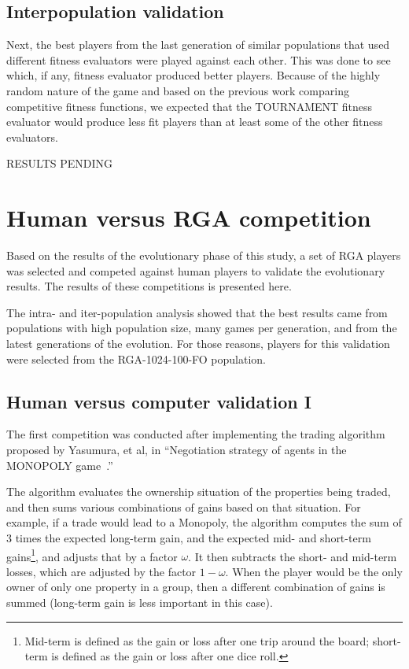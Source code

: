 \subsection{Interpopulation validation}

Next, the best players from the last generation of similar populations that used
different fitness evaluators were played against each other. This was done to
see which, if any, fitness evaluator produced better players. Because of the
highly random nature of the game and based on the previous work comparing
competitive fitness functions, we expected that the TOURNAMENT fitness evaluator
would produce less fit players than at least some of the other fitness
evaluators.

RESULTS PENDING

\section{Human versus RGA competition}

Based on the results of the evolutionary phase of this study, a set of RGA
players was selected and competed against human players to validate the
evolutionary results. The results of these competitions is presented here.

The intra- and iter-population analysis showed that the best results came from
populations with high population size, many games per generation, and from the
latest generations of the evolution. For those reasons, players for this
validation were selected from the RGA-1024-100-FO population.

\subsection{Human versus computer validation I}

The first competition was conducted after implementing the trading algorithm
proposed by Yasumura, et al, in ``Negotiation strategy of agents in the MONOPOLY
game~\cite{Yasumura2001Negotiate}.''

The algorithm evaluates the ownership situation of the properties being traded,
and then sums various combinations of gains based on that situation. For
example, if a trade would lead to a Monopoly, the algorithm computes the sum of
3 times the expected long-term gain, and the expected mid- and short-term
gains\footnote{Mid-term is defined as the gain or loss after one trip around the
board; short-term is defined as the gain or loss after one dice roll.}, and
adjusts that by a factor \(\omega\). It then subtracts the short- and mid-term
losses, which are adjusted by the factor \(1-\omega\). When the player would be
the only owner of only one property in a group, then a different combination of
gains is summed (long-term gain is less important in this case).

